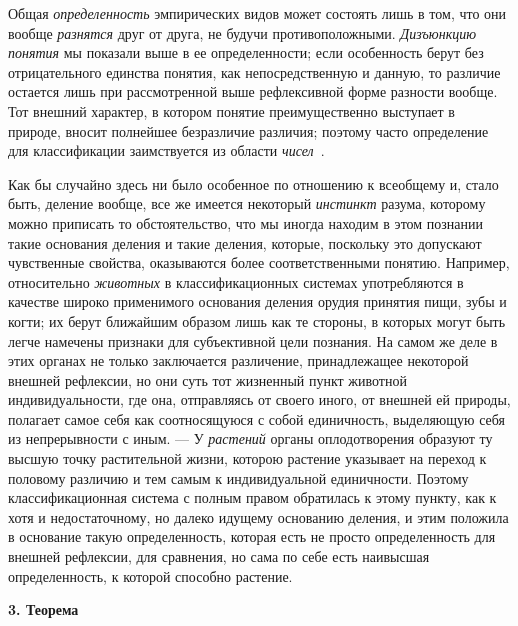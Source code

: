 \documentclass[twoside]{article}
\begin{document}
Общая {\em определенность}
эмпирических видов может состоять лишь в том, что они вообще
{\em разнятся} друг от
друга, не будучи противоположными.
{\em Дизъюнкцию понятия}
мы показали выше в ее определенности; если особенность берут
без отрицательного единства понятия, как непосредственную и данную, то
различие остается лишь при рассмотренной выше рефлексивной форме разности
вообще. Тот внешний характер, в котором понятие преимущественно выступает в
природе, вносит полнейшее безразличие различия; поэтому часто определение
для классификации заимствуется из области
{\em чисел}~\label{bkm:bm107}.

Как бы случайно здесь ни было особенное по отношению к
всеобщему и, стало быть, деление вообще, все же имеется некоторый
{\em инстинкт} разума,
которому можно приписать то обстоятельство, что мы иногда находим в этом
познании такие основания деления и такие деления, которые, поскольку это
допускают чувственные свойства, оказываются более соответственными понятию.
Например, относительно {\em животных}
в классификационных системах употребляются в качестве широко
применимого основания деления орудия принятия пищи, зубы и когти; их берут
ближайшим образом лишь как те стороны, в которых могут быть легче намечены
признаки для субъективной цели познания. На самом же деле в этих органах не
только заключается различение, принадлежащее некоторой внешней рефлексии,
но они суть тот жизненный пункт животной индивидуальности, где она,
отправляясь от своего иного, от внешней ей природы, полагает самое себя
как соотносящуюся с собой единичность, выделяющую себя из непрерывности с
иным. — У {\em растений} органы
оплодотворения образуют ту высшую точку растительной жизни, которою
растение указывает на переход к половому различию и тем самым к
индивидуальной единичности. Поэтому классификационная система с полным
правом обратилась к этому пункту, как к хотя и недостаточному, но далеко
идущему основанию деления, и этим положила в основание такую
определенность, которая есть не просто определенность для внешней
рефлексии, для сравнения, но сама по себе есть наивысшая определенность, к
которой способно растение.

{\centering\bfseries 3. Теорема \par}
\end{document}

